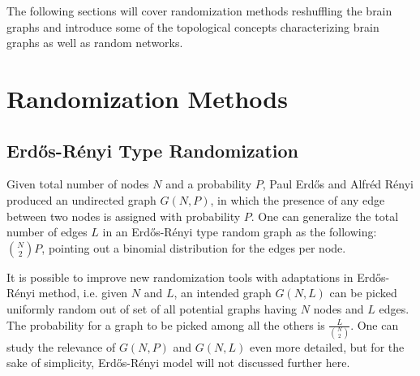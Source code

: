 The following sections will cover randomization methods reshuffling the brain graphs and introduce some of the topological concepts characterizing brain graphs as well as random networks.



\section{Randomization Methods}





\subsection{Erd\H{o}s-R\'{e}nyi Type Randomization}

Given total number of nodes $N$ and a probability $P$, Paul Erd\H{o}s and Alfr\'{e}d R\'{e}nyi produced an undirected graph $G(N,P)$, in which the presence of any edge between two nodes is assigned with probability $P$. 
One can generalize the total number of edges $L$ in an  Erd\H{o}s-R\'{e}nyi type random graph as the following: $\binom {N} {2}P$, pointing out a binomial distribution for the edges per node.

It is possible to improve new randomization tools with adaptations in Erd\H{o}s-R\'{e}nyi method, i.e. given $N$ and $L$, an intended graph $G(N,L)$ can be picked uniformly random out of set of all potential graphs having $N$ nodes and $L$ edges. The probability for a graph to be picked among all the others is $\frac{L}{\binom {N}{2}}  $. One can study the relevance of $G(N,P)$ and $G(N,L)$ even more detailed, but for the sake of simplicity, Erd\H{o}s-R\'{e}nyi model will not discussed further here.

